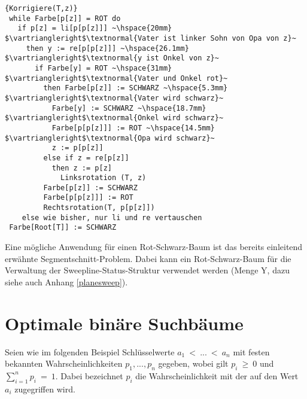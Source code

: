 \documentclass[ngerman,draft,parskip=half*,twoside]{scrreprt}
\theoremstyle{break}
\begin{document}
\begin{Algorithmus}[H]
\begin{lstlisting}[frame=tlrb, mathescape=true, title=\textsc{Korrigiere\textnormal{(T, z)}}, gobble=1]{Korrigiere(T,z)}
 while Farbe[p[z]] = ROT do
   if p[z] = li[p[p[z]]] ~\hspace{20mm}  $\vartriangleright$\textnormal{Vater ist linker Sohn von Opa von z}~
     then y := re[p[p[z]]] ~\hspace{26.1mm} $\vartriangleright$\textnormal{y ist Onkel von z}~
       if Farbe[y] = ROT ~\hspace{31mm} $\vartriangleright$\textnormal{Vater und Onkel rot}~
         then Farbe[p[z]] := SCHWARZ ~\hspace{5.3mm} $\vartriangleright$\textnormal{Vater wird schwarz}~
           Farbe[y] := SCHWARZ ~\hspace{18.7mm} $\vartriangleright$\textnormal{Onkel wird schwarz}~
           Farbe[p[p[z]]] := ROT ~\hspace{14.5mm} $\vartriangleright$\textnormal{Opa wird schwarz}~
           z := p[p[z]]
         else if z = re[p[z]]
           then z := p[z]
             Linksrotation (T, z)
         Farbe[p[z]] := SCHWARZ
         Farbe[p[p[z]]] := ROT
         Rechtsrotation(T, p[p[z]])
    else wie bisher, nur li und re vertauschen
 Farbe[Root[T]] := SCHWARZ
\end{lstlisting}
\end{Algorithmus}

Eine mögliche Anwendung für einen Rot-Schwarz-Baum ist das bereits einleitend erwähnte Segmentschnitt-Problem. Dabei kann ein
Rot-Schwarz-Baum für die Verwaltung der Sweepline-Status-Struktur verwendet werden (Menge Y, dazu siehe auch Anhang \ref{planesweep}).

\section{Optimale binäre Suchbäume}

Seien wie im folgenden Beispiel Schlüsselwerte $a_1\:<\:...\:<\:a_n$ mit festen bekannten Wahrscheinlichkeiten $p_1,...,p_n$ gegeben, wobei gilt $p_i\:
\geq\:0$ und $\sum_{i=1}^n p_i\:=\:1$. Dabei bezeichnet $p_i$ die Wahrscheinlichkeit mit der auf den Wert $a_i$ zugegriffen wird.
\end{document}
